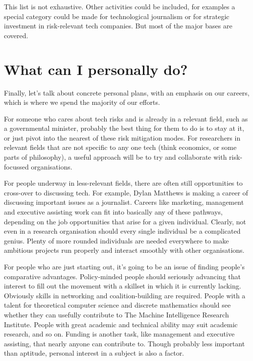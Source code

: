 ﻿\documentclass[12pt]{article}
\begin{document}
This list is not exhaustive. Other activities could be included, for examples a special category could be made for technological journalism or for strategic investment in risk-relevant tech companies. But most of the major bases are covered.

\section{What can I personally do?}
Finally, let's talk about concrete personal plans, with an emphasis on our careers, which is where we spend the majority of our efforts.

For someone who cares about tech risks and is already in a relevant field, such as a governmental minister, probably the best thing for them to do is to stay at it, or just pivot into the nearest of these risk mitigation modes. For researchers in relevant fields that are not specific to any one tech (think economics, or some parts of philosophy), a useful approach will be to try and collaborate with risk-focussed organisations.

For people underway in less-relevant fields, there are often still opportunities to cross-over to discussing tech. For example, Dylan Matthews is making a career of discussing important issues as a journalist. Careers like marketing, management and executive assisting work can fit into basically any of these pathways, depending on the job opportunities that arise for a given individual. Clearly, not even in a research organisation should every single individual be a complicated genius. Plenty of more rounded individuals are needed everywhere to make ambitious projects run properly and interact smoothly with other organisations.

For people who are just starting out, it's going to be an issue of finding people's comparative advantages. Policy-minded people should seriously advancing that interest to fill out the movement with a skillset in which it is currently lacking. Obviously skills in networking and coalition-building are required. People with a talent for theoretical computer science and discrete mathematics should see whether they can usefully contribute to The Machine Intelligence Research Institute. People with great academic and technical ability may suit academic research, and so on. Funding is another task, like management and executive assisting, 
that nearly anyone can contribute to. Though probably less important than aptitude, personal interest in a subject is also a factor.
\end{document}
